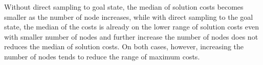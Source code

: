 \documentclass[conference]{IEEEtran}
\begin{document}
Without direct sampling to goal state, the median of solution costs becomes smaller as the number of node increases, while with direct sampling to the goal state, the median of the costs is already on the lower range of solution costs even with smaller number of nodes and further increase the number of nodes does not reduces the median of solution costs. On both cases, however, increasing the number of nodes tends to reduce the range of maximum costs.

\end{document}
